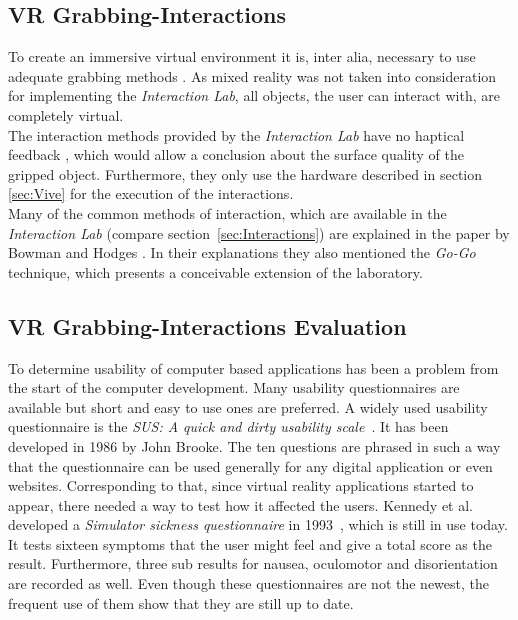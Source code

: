 \subsection{VR Grabbing-Interactions}\label{sec:SOTAInteractions}
To create an immersive virtual environment it is, inter alia, necessary to use adequate grabbing methods \cite{Bowman}. As mixed reality was not taken into consideration for implementing the \textit{Interaction Lab}, all objects, the user can interact with, are completely virtual. \\
The interaction methods provided by the \textit{Interaction Lab} have no haptical feedback \cite{768179}, which would allow a conclusion about the surface quality of the gripped object. Furthermore, they only use the hardware described in section \ref{sec:Vive} for the execution of the interactions. \\
Many of the common methods of interaction, which are available in the \textit{Interaction Lab} (compare section~\ref {sec:Interactions}) are explained in the paper by Bowman and Hodges \cite{Bowman}. In their explanations they also mentioned the  \textit{Go-Go} technique, which presents a conceivable extension of the laboratory.

\subsection{VR Grabbing-Interactions Evaluation}\label{sec:SOTAInteractionEvalution}
To determine usability of computer based applications has been a problem from the start of the computer development. Many usability questionnaires are available but short and easy to use ones are preferred. A widely used usability questionnaire is the \textit{SUS: A quick and dirty usability scale}~\cite{6sus}. It has been developed in 1986 by John Brooke. The ten questions are phrased in such a way that the questionnaire can be used generally for any digital application or even websites. 
Corresponding to that, since virtual reality applications started to appear, there needed a way to test how it affected the users. Kennedy et al. developed a \textit{Simulator sickness questionnaire} in 1993~\cite{ssq}, which is still in use today. It tests sixteen symptoms that the user might feel and give a total score as the result. Furthermore, three sub results for nausea, oculomotor and disorientation are recorded as well. Even though these questionnaires are not the newest, the frequent use of them show that they are still up to date. 

\newpage
